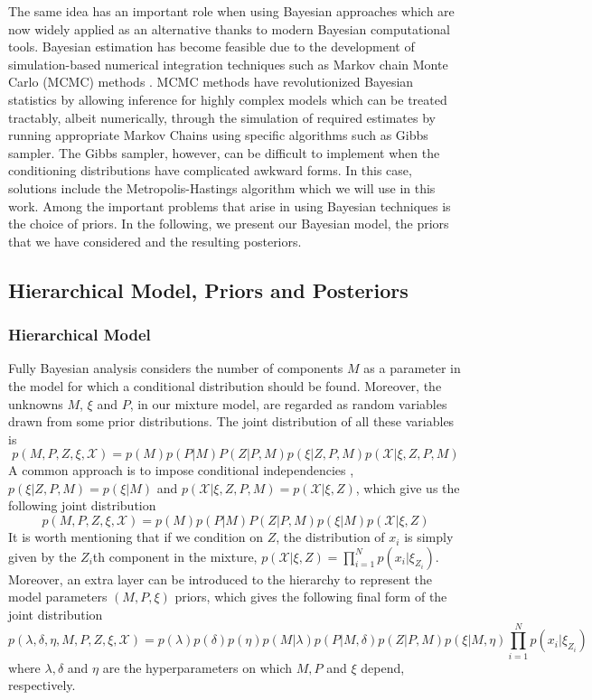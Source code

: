 \documentclass[journal,10pt]{elsart}
\begin{document}
The same idea has an important role when using Bayesian approaches which are now widely applied as an alternative thanks to modern Bayesian computational tools. Bayesian estimation has become feasible due to the development of simulation-based numerical integration techniques such as Markov chain Monte Carlo (MCMC) methods \cite{Robert2007}. MCMC methods have revolutionized Bayesian statistics by allowing inference for highly complex models which can be treated tractably, albeit numerically, through the simulation of required estimates by running appropriate Markov Chains using specific algorithms such as Gibbs sampler. The Gibbs sampler, however, can be difficult to implement when the conditioning distributions have complicated awkward forms. In this case, solutions include the Metropolis-Hastings algorithm \cite{Robert2007} which we will use in this work. Among the important problems that arise in using Bayesian techniques is the choice of priors. In the following, we present our Bayesian model, the priors that we have considered and the resulting posteriors.
\subsection{Hierarchical Model, Priors and Posteriors}
\subsubsection{Hierarchical Model}
Fully Bayesian analysis considers the number of components $M$ as a parameter in the model for which a conditional distribution should be found.
Moreover, the unknowns $M$, $\xi$ and $P$, in our mixture model, are regarded as random variables drawn from some prior distributions. The joint distribution of all these variables is
\begin{equation*}
p(M,P,Z,\xi,\mathcal{X})=p(M)p(P|M)P(Z|P,M)p(\xi|Z,P,M)p(\mathcal{X}|\xi,Z,P,M)
\end{equation*}
A common approach is to impose conditional independencies \cite{Green1997}, $p(\xi|Z,P,M)=p(\xi|M)$ and $p(\mathcal{X}|\xi,Z,P,M)=p(\mathcal{X}|\xi,Z)$, which give us the following joint distribution
\begin{equation*}
p(M,P,Z,\xi,\mathcal{X})=p(M)p(P|M)P(Z|P,M)p(\xi|M)p(\mathcal{X}|\xi,Z)
\end{equation*}
It is worth mentioning that if we condition on $Z$, the distribution of $x_i$ is simply given by the $Z_{i}$th component in the mixture, $p(\mathcal{X}|\xi,Z)=\prod_{i=1}^Np(x_i|\xi_{Z_i})$. Moreover, an extra layer can be introduced to the hierarchy to represent the model parameters $(M,P,\xi)$ priors, which gives the following final form of the joint distribution
\begin{equation}\label{finaljoint}
p(\lambda,\delta,\eta,M,P,Z,\xi,\mathcal{X})=p(\lambda)p(\delta)p(\eta)p(M|\lambda)p(P|M,\delta)p(Z|P,M)p(\xi|M,\eta)\prod_{i=1}^Np(x_i|\xi_{Z_i})
\end{equation}
where $\lambda,\delta$ and $\eta$ are the hyperparameters on which $M, P$ and $\xi$ depend, respectively.
\end{document}
